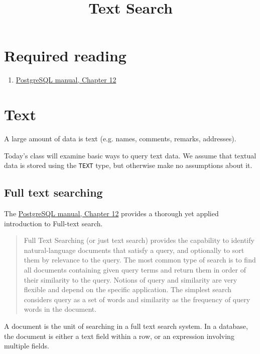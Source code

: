 \documentclass{pgnotes}
\title{Text Search}
\begin{document}
\maketitle

\section*{Required reading}

\begin{enumerate}
  
\item \href{https://www.postgresql.org/docs/current/textsearch-intro.html}{PostgreSQL manual, Chapter 12}
\end{enumerate}

\tableofcontents

\section{Text}

A large amount of data is text (e.g. names, comments, remarks, addresses).

Today's class will examine basic ways to query text data.
We assume that textual data is stored using the \texttt{TEXT} type, but otherwise make no assumptions about it.

\subsection{Full text searching}

The \href{https://www.postgresql.org/docs/current/textsearch.html}{PostgreSQL manual, Chapter 12} provides a thorough yet applied introduction to Full-text search.
\begin{quotation}
  Full Text Searching (or just text search) provides the capability to identify natural-language documents that satisfy a query, and optionally to sort them by relevance to the query. The most common type of search is to find all documents containing given query terms and return them in order of their similarity to the query. Notions of query and similarity are very flexible and depend on the specific application. The simplest search considers query as a set of words and similarity as the frequency of query words in the document.
\end{quotation}
A document is the unit of searching in a full text search system.
In a database, the document is either a text field within a row, or an expression involving multiple fields. 
\end{document}
